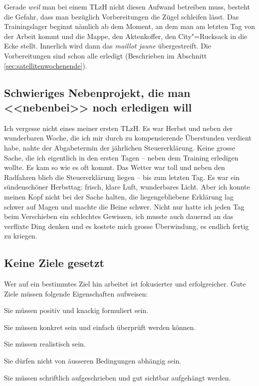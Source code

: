 \documentclass[a4paper,DIV13,BCOR0cm,draft=TRUE]{scrartcl}
\newcommand{\tlzh}{TLzH}
\begin{document}
Gerade \emph{weil} man bei einem \tlzh{} nicht diesen Aufwand betreiben muss, besteht die Gefahr,
dass man bezüglich Vorbereitungen die Zügel schleifen lässt.
Das Trainingslager beginnt nämlich ab dem Moment, an dem man am letzten Tag von der Arbeit kommt und
die Mappe, den Aktenkoffer, den City"=Rucksack in die Ecke stellt.
Innerlich wird dann das \textsl{maillot jaune} übergestreift.
Die Vorbereitungen sind schon alle erledigt (Beschrieben im Abschnitt \ref{sec:satellitenwochenende}).

\subsection{Schwieriges Nebenprojekt, die man <<nebenbei>> noch erledigen will}

Ich vergesse nicht eines meiner ersten \tlzh{}. Es war Herbst und neben der wunderbaren Woche,
die ich mir durch zu kompensierende Überstunden verdient habe, nahte der Abgabetermin der jährlichen Steuererklärung.
Keine grosse Sache, die ich eigentlich in den ersten Tagen -- neben dem Training erledigen wollte.
Es kam so wie es oft kommt. Das Wetter war toll und neben den Radfahren blieb die Steuererklärung liegen -- bis zum letzten Tag.
Es war ein sündenschöner Herbsttag: frisch, klare Luft, wunderbares Licht.
Aber ich konnte meinen Kopf nicht bei der Sache halten, die liegengebliebene Erklärung lag schwer auf Magen und machte die Beine schwer.
Nicht nur hatte ich jeden Tag beim Verschieben ein schlechtes Gewissen,
ich musste auch dauernd an das verflixte Ding denken und es kostete mich grosse Überwindung, es endlich fertig zu kriegen.

\subsection{Keine Ziele gesetzt}

Wer auf ein bestimmtes Ziel hin arbeitet ist fokusierter und erfolgreicher.
Gute Ziele müssen folgende Eigenschaften aufweisen:

\begin{itemize*}
  \item Sie müssen positiv und knackig formuliert sein.
  \item Sie müssen konkret sein und einfach überprüft werden können.
  \item Sie müssen realistisch sein.
  \item Sie dürfen nicht von äusseren Bedingungen abhängig sein.
  \item Sie müssen schriftlich aufgeschrieben und gut sichtbar aufgehängt werden.
\end{itemize*}
\end{document}
